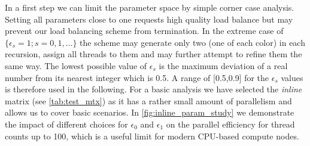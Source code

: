 In a first step we can limit the parameter space by simple corner case analysis. Setting all parameters close to one requests high quality load balance but may prevent our load balancing scheme from termination. In the extreme case of $\{\epsilon_s=1; s=0,1,\ldots\}$ the scheme may generate only two \levelGroups (one of each color) in each recursion, assign all threads to them and may further attempt to refine them the same way.  The lowest possible value of $\epsilon_s$ is the maximum deviation of a real number from its nearest integer which is 0.5. A range of  [0.5,0.9] for the $\epsilon_s$ values is therefore used in the following. For a basic analysis we have selected the \emph{inline} matrix (see \cref{tab:test_mtx}) as it has a rather small amount of parallelism and allows us to cover basic scenarios. In \cref{fig:inline_param_study}  we demonstrate the impact of different choices for $\epsilon_0$ and $\epsilon_1$ on the parallel efficiency for thread counts up to 100, which is a useful limit for modern CPU-based compute nodes. 
%
